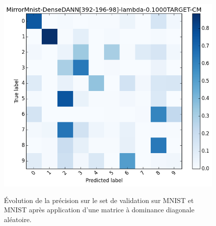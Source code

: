 \begin{figure}[htbp]
	{\includegraphics[width=\columnwidth]{fig/MirrorMnist-DenseDANN[392-196-98]-lambda-0,1000TARGET-CM.png}}
\hfill
{}
\caption{Évolution de la précision sur le set de validation sur MNIST et MNIST
	après application d'une matrice à dominance diagonale aléatoire.}
\label{fig:MNIST-Mirror-CM}
\end{figure}

